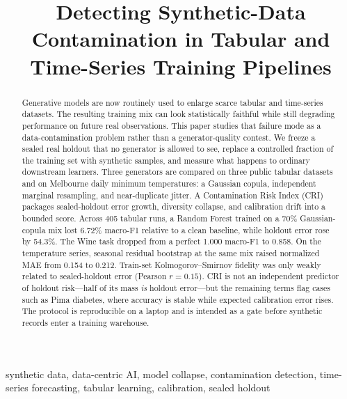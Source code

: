 \documentclass[conference]{IEEEtran}
\begin{document}
\title{Detecting Synthetic-Data Contamination in Tabular and Time-Series Training Pipelines}

\author{
}

\maketitle

\begin{abstract}
Generative models are now routinely used to enlarge scarce tabular and time-series datasets.
The resulting training mix can look statistically faithful while still degrading performance on future real observations.
This paper studies that failure mode as a data-contamination problem rather than a generator-quality contest.
We freeze a sealed real holdout that no generator is allowed to see, replace a controlled fraction of the training set with synthetic samples, and measure what happens to ordinary downstream learners.
Three generators are compared on three public tabular datasets and on Melbourne daily minimum temperatures: a Gaussian copula, independent marginal resampling, and near-duplicate jitter.
A Contamination Risk Index (CRI) packages sealed-holdout error growth, diversity collapse, and calibration drift into a bounded score.
Across 405 tabular runs, a Random Forest trained on a 70\% Gaussian-copula mix lost 6.72\% macro-F1 relative to a clean baseline, while holdout error rose by 54.3\%.
The Wine task dropped from a perfect 1.000 macro-F1 to 0.858.
On the temperature series, seasonal residual bootstrap at the same mix raised normalized MAE from 0.154 to 0.212.
Train-set Kolmogorov--Smirnov fidelity was only weakly related to sealed-holdout error (Pearson $r=0.15$).
CRI is not an independent predictor of holdout risk---half of its mass \emph{is} holdout error---but the remaining terms flag cases such as Pima diabetes, where accuracy is stable while expected calibration error rises.
The protocol is reproducible on a laptop and is intended as a gate before synthetic records enter a training warehouse.
\end{abstract}

\begin{IEEEkeywords}
synthetic data, data-centric AI, model collapse, contamination detection, time-series forecasting, tabular learning, calibration, sealed holdout
\end{IEEEkeywords}
\end{document}
